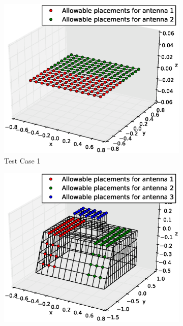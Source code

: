 \documentclass[conference]{IEEEtran}
\begin{document}
\begin{figure}
    \centering
    \begin{subfigure}{.5\columnwidth}
        \includegraphics[width=\columnwidth,height=\columnwidth]{FIG/tc_1_figure}%
        \caption{Test Case 1}%
    \label{fig:tc1_figure}%
    \end{subfigure}\hfill%
    \begin{subfigure}{.5\columnwidth}
        \includegraphics[width=\columnwidth, height=\columnwidth]{FIG/tc_2_figure}%

\end{subfigure}
\end{figure}
\end{document}
